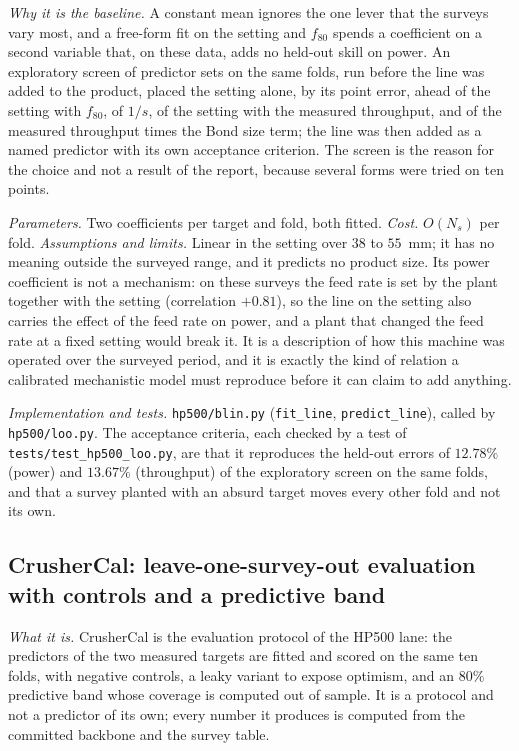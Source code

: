 \emph{Why it is the baseline.} A constant mean ignores the one lever that the surveys vary most, and a free-form fit on the setting and $f_{80}$
spends a coefficient on a second variable that, on these data, adds no held-out skill on power. An exploratory screen of predictor sets on the same
folds, run before the line was added to the product, placed the setting alone, by its point error, ahead of the setting with $f_{80}$, of $1/s$, of the setting with
the measured throughput, and of the measured throughput times the Bond size term; the line was then added as a named predictor with its own
acceptance criterion. The screen is the reason for the choice and not a result of the report, because several forms were tried on ten points.

\emph{Parameters.} Two coefficients per target and fold, both fitted. \emph{Cost.} $O(N_s)$ per fold. \emph{Assumptions and limits.} Linear in the
setting over $38$ to $55$~mm; it has no meaning outside the surveyed range, and it predicts no product size. Its power coefficient is not a
mechanism: on these surveys the feed rate is set by the plant together with the setting (correlation $+0.81$), so the line on the setting also
carries the effect of the feed rate on power, and a plant that changed the feed rate at a fixed setting would break it. It is a description of
how this machine was operated over the surveyed period, and it is exactly the kind of relation a calibrated mechanistic model must reproduce
before it can claim to add anything.

\emph{Implementation and tests.} \texttt{hp500/\allowbreak{}blin.py} (\texttt{fit\_line}, \texttt{predict\_line}), called by \texttt{hp500/\allowbreak{}loo.py}. The
acceptance criteria, each checked by a test of \texttt{tests/\allowbreak{}test\_hp500\_loo.py}, are that it reproduces the held-out errors of
$12.78\%$ (power) and $13.67\%$ (throughput) of the exploratory screen on the same folds, and that a survey planted with an absurd target moves
every other fold and not its own.

\subsection{CrusherCal: leave-one-survey-out evaluation with controls and a predictive band}\label{sec:m-crushercal}

\emph{What it is.} CrusherCal is the evaluation protocol of the HP500 lane: the predictors of the two measured targets are fitted and scored on the
same ten folds, with negative controls, a leaky variant to expose optimism, and an $80\%$ predictive band whose coverage is computed out of sample.
It is a protocol and not a predictor of its own; every number it produces is computed from the committed backbone and the survey table.

